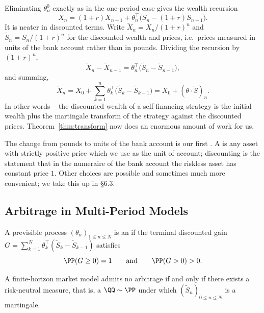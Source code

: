 Eliminating $\theta_n^0$ exactly as in the one-period case gives the wealth recursion
$$
X_n = (1+r)X_{n-1} + \theta_n^\top\big(S_n - (1+r)S_{n-1}\big).
$$
It is neater in discounted terms. Write $\tilde X_n = X_n/(1+r)^n$ and $\tilde S_n = S_n/(1+r)^n$ for the discounted wealth and prices, i.e.\ prices measured in units of the bank account rather than in pounds. Dividing the recursion by $(1+r)^n$,
$$
\tilde X_n - \tilde X_{n-1} = \theta_n^\top\big(\tilde S_n - \tilde S_{n-1}\big),
$$
and summing,
$$
\boxed{\;\tilde X_n = X_0 + \sum_{k=1}^n \theta_k^\top\big(\tilde S_k - \tilde S_{k-1}\big) = X_0 + (\theta\cdot\tilde S)_n.\;}
$$
In other words -- the discounted wealth of a self-financing strategy is the initial wealth plus the martingale transform of the strategy against the discounted prices. Theorem~\ref{thm:transform} now does an enormous amount of work for us.

\begin{remark}
	The change from pounds to units of the bank account is our first . A  is any asset with strictly positive price which we use as the unit of account; discounting is the statement that in the numeraire of the bank account the riskless asset has constant price $1$. Other choices are possible and sometimes much more convenient; we take this up in \S6.3.
\end{remark}

\subsection{Arbitrage in Multi-Period Models}

\begin{definition}[Arbitrage]
	A previsible process $(\theta_n)_{1\leq n\leq N}$ is an  if the terminal discounted gain $G = \sum_{k=1}^N \theta_k^\top(\tilde S_k - \tilde S_{k-1})$ satisfies
	$$
	\PP(G \geq 0) = 1 \qquad\text{and}\qquad \PP(G>0)>0.
	$$
\end{definition}

\begin{theorem}\label{thm:ftap-multi}
	A finite-horizon market model admits no arbitrage if and only if there exists a risk-neutral measure, that is, a $\QQ\sim\PP$ under which $(\tilde S_n)_{0\leq n\leq N}$ is a martingale.
\end{theorem}

